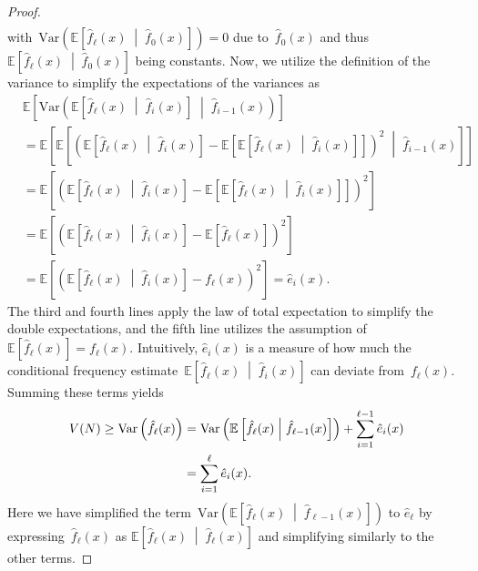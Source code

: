 \documentclass[sigconf]{acmart}
\begin{document}
\begin{proof}
\begin{align*}
    \end{align*}
    with~$\mathrm{Var}\left( \mathbb{E}\left[ \hat{f}_\ell(x) \;\middle|\; \hat{f}_0(x) \right] \right)=0$ 
    due to~$\hat{f}_0(x)$ and 
    thus~$\mathbb{E}\left[ \hat{f}_\ell(x) \;\middle|\; \hat{f}_0(x) \right]$
    being constants. Now, we utilize the definition of the variance to simplify
    the expectations of the variances as
    \begin{align*}
        & \mathbb{E}\left[ \mathrm{Var}\left( \mathbb{E}\left[ \hat{f}_\ell(x) \;\middle|\; \hat{f}_i(x) \right] \;\middle|\; \hat{f}_{i - 1}(x) \right) \right] \\
        & = \mathbb{E}\left[ \mathbb{E}\left[ \left( \mathbb{E}\left[ \hat{f}_\ell(x) \;\middle|\; \hat{f}_i(x) \right] - \mathbb{E}\left[ \mathbb{E}\left[ \hat{f}_\ell(x) \;\middle|\; \hat{f}_i(x) \right] \right] \right)^2 \;\middle|\; \hat{f}_{i - 1}(x) \right] \right] \\
        & = \mathbb{E}\left[ \left( \mathbb{E}\left[ \hat{f}_\ell(x) \;\middle|\; \hat{f}_i(x) \right] - \mathbb{E}\left[ \mathbb{E}\left[ \hat{f}_\ell(x) \;\middle|\; \hat{f}_i(x) \right] \right] \right)^2 \right] \\
        & = \mathbb{E}\left[ \left( \mathbb{E}\left[ \hat{f}_\ell(x) \;\middle|\; \hat{f}_i(x) \right] - \mathbb{E}\left[ \hat{f}_\ell(x) \right] \right)^2 \right] \\
        & = \mathbb{E}\left[ \left( \mathbb{E}\left[ \hat{f}_\ell(x) \;\middle|\; \hat{f}_i(x) \right] - f_\ell(x) \right)^2 \right] = \hat{e}_i(x).
    \end{align*}
    The third and fourth lines apply the law of total expectation to simplify
    the double expectations, and the fifth line utilizes the assumption
    of~$\mathbb{E}[\hat{f}_\ell(x)] = f_\ell(x)$. Intuitively, $\hat{e}_i(x)$
    is a measure of how much the conditional frequency
    estimate~$\mathbb{E}\left[ \hat{f}_\ell(x) \;\middle|\; \hat{f}_i(x) \right]$ 
    can deviate from~$f_\ell(x)$. Summing these terms yields
    \begin{align}
        V(N) \geq \mathrm{Var}\left( \hat{f}_\ell(x) \right) & = \mathrm{Var}\left( \mathbb{E}\left[ \hat{f}_\ell(x) \;\middle|\; \hat{f}_{\ell - 1}(x) \right] \right) + \sum_{i=1}^{\ell - 1} \hat{e}_i(x) \notag \\ 
        & = \sum_{i=1}^\ell \hat{e}_i(x). \label{eq:total_variance}
    \end{align}
    Here we have simplified the term~$\mathrm{Var}\left( \mathbb{E}\left[ \hat{f}_\ell(x) \;\middle|\; \hat{f}_{\ell - 1}(x) \right] \right)$ 
    to $\hat{e}_\ell$ by expressing~$\hat{f}_\ell(x)$ as 
    $\mathbb{E}\left[ \hat{f}_\ell(x) \;\middle|\; \hat{f}_\ell(x) \right]$ and
    simplifying similarly to the other terms. 


\end{proof}
\end{document}
